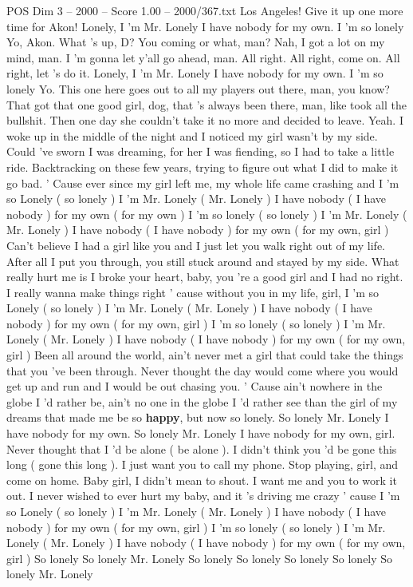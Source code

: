 \begin{textsample}{POS Dim 3 – 2000 – Score 1.00 – 2000/367.txt}  \label{ex:f3_pos_039}
Los Angeles!
Give it up one more time for Akon!
Lonely, I 'm Mr.
Lonely I have nobody for my own.
I 'm so lonely Yo, Akon.
What 's up, D?
You coming or what, man?
Nah, I got a lot on my mind, man.
I 'm gonna let y'all go ahead, man.
All right.
All right, come on.
All right, let 's do it.
Lonely, I 'm Mr.
Lonely I have nobody for my own.
I 'm so lonely Yo.
This one here goes out to all my players out there, man, you know?
That got that one good girl, dog, that 's always been there, man, like took all the bullshit.
Then one day she couldn't take it no more and decided to leave.
Yeah.
I woke up in the middle of the night and I noticed my girl wasn't by my side.
Could 've sworn I was dreaming, for her I was fiending, so I had to take a little ride.
Backtracking on these few years, trying to figure out what I did to make it go bad. ' Cause ever since my girl left me, my whole life came crashing and I 'm so Lonely ( so lonely ) I 'm Mr.
Lonely ( Mr.
Lonely ) I have nobody ( I have nobody ) for my own ( for my own ) I 'm so lonely ( so lonely ) I 'm Mr.
Lonely ( Mr.
Lonely ) I have nobody ( I have nobody ) for my own ( for my own, girl ) Can't believe I had a girl like you and I just let you walk right out of my life.
After all I put you through, you still stuck around and stayed by my side.
What really hurt me is I broke your heart, baby, you 're a good girl and I had no right.
I really wanna make things right ' cause without you in my life, girl, I 'm so Lonely ( so lonely ) I 'm Mr.
Lonely ( Mr.
Lonely ) I have nobody ( I have nobody ) for my own ( for my own, girl ) I 'm so lonely ( so lonely ) I 'm Mr.
Lonely ( Mr.
Lonely ) I have nobody ( I have nobody ) for my own ( for my own, girl ) Been all around the world, ain't never met a girl that could take the things that you 've been through.
Never thought the day would come where you would get up and run and I would be out chasing you. ' Cause ain't nowhere in the globe I 'd rather be, ain't no one in the globe I 'd rather see than the girl of my dreams that made me be so \textbf{happy}, but now so lonely.
So lonely Mr.
Lonely I have nobody for my own.
So lonely Mr.
Lonely I have nobody for my own, girl.
Never thought that I 'd be alone ( be alone ).
I didn't think you 'd be gone this long ( gone this long ).
I just want you to call my phone.
Stop playing, girl, and come on home.
Baby girl, I didn't mean to shout.
I want me and you to work it out.
I never wished to ever hurt my baby, and it 's driving me crazy ' cause I 'm so Lonely ( so lonely ) I 'm Mr.
Lonely ( Mr.
Lonely ) I have nobody ( I have nobody ) for my own ( for my own, girl ) I 'm so lonely ( so lonely ) I 'm Mr.
Lonely ( Mr.
Lonely ) I have nobody ( I have nobody ) for my own ( for my own, girl ) So lonely So lonely Mr.
Lonely So lonely So lonely So lonely So lonely So lonely Mr.
Lonely

\end{textsample}
